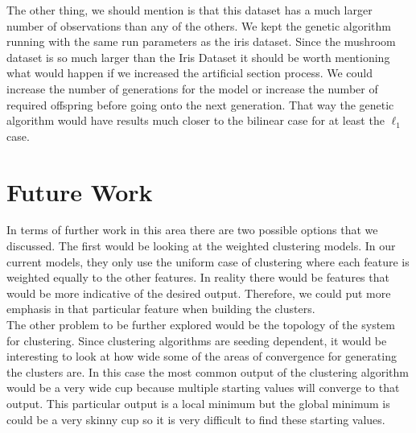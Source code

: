\documentclass[a4paper,12pt]{article}
\numberwithin{equation}{section}
\begin{document}
The other thing, we should mention is that this dataset has a much larger number of observations than any of the others. We kept the genetic algorithm running with the same run parameters as the iris dataset. Since the mushroom dataset is so much larger than the Iris Dataset it should be worth mentioning what would happen if we increased the artificial section process. We could increase the number of generations for the model or increase the number of required offspring before going onto the next generation. That way the genetic algorithm would have results much closer to the bilinear case for at least the $\ell_1$ case.

\section{Future Work}
In terms of further work in this area there are two possible options that we discussed. The first would be looking at the weighted clustering models. In our current models, they only use the uniform case of clustering where each feature is weighted equally to the other features. In reality there would be features that would be more indicative of the desired output. Therefore, we could put more emphasis in that particular feature when building the clusters.  \\

The other problem to be further explored would be the topology of the system for clustering. Since clustering algorithms are seeding dependent, it would be interesting to look at how wide some of the areas of convergence for generating the clusters are. In this case the most common output of the clustering algorithm would be a very wide cup because multiple starting values will converge to that output. This particular output is a local minimum but the global minimum is could be a very skinny cup so it is very difficult to find these starting values. 



\end{document}
